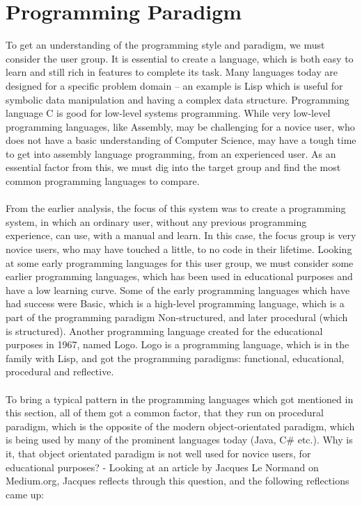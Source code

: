 
\section{Programming Paradigm}
\label{programmingparadigm}
To get an understanding of the programming style and paradigm, we must consider the user group. It is essential to create a language, which is both easy to learn and still rich in features to complete its task. Many languages today are designed for a specific problem domain – an example is Lisp which is useful for symbolic data manipulation and having a complex data structure. Programming language C is good for low-level systems programming. While very low-level programming languages, like Assembly, may be challenging for a novice user, who does not have a basic understanding of Computer Science, may have a tough time to get into assembly language programming, from an experienced user. As an essential factor from this, we must dig into the target group and find the most common programming languages to compare. \\
\\
From the earlier analysis, the focus of this system was to create a programming system, in which an ordinary user, without any previous programming experience, can use, with a manual and learn. In this case, the focus group is very novice users, who may have touched a little, to no code in their lifetime. Looking at some early programming languages for this user group, we must consider some earlier programming languages, which has been used in educational purposes and have a low learning curve. Some of the early programming languages which have had success were Basic, which is a high-level programming language, which is a part of the programming paradigm Non-structured, and later procedural (which is structured). Another programming language created for the educational purposes in 1967, named Logo. Logo is a programming language, which is in the family with Lisp, and got the programming paradigms: functional, educational, procedural and reflective.\cite{scott2000programming} \\
\\
To bring a typical pattern in the programming languages which got mentioned in this section, all of them got a common factor, that they run on procedural paradigm, which is the opposite of the modern object-orientated paradigm, which is being used by many of the prominent languages today (Java, C\# etc.). Why is it, that object orientated paradigm is not well used for novice users, for educational purposes? - Looking at an article by Jacques Le Normand on Medium.org, Jacques reflects through this question, and the following reflections came up:\cite{tutlisp}\cite{medlisp} \\
